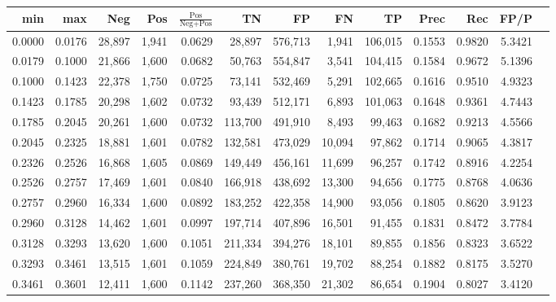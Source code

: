 \begin{tabular}{rrrrrrrrrrrrr}
\toprule
   min &    max &    Neg &   Pos & $\frac{\text{Pos}}{\text{Neg}+\text{Pos}}$ &      TN &      FP &      FN &      TP &   Prec &    Rec &   FP/P \\
\midrule
0.0000 & 0.0176 & 28,897 & 1,941 &                                     0.0629 &  28,897 & 576,713 &   1,941 & 106,015 & 0.1553 & 0.9820 & 5.3421 \\
0.0179 & 0.1000 & 21,866 & 1,600 &                                     0.0682 &  50,763 & 554,847 &   3,541 & 104,415 & 0.1584 & 0.9672 & 5.1396 \\
0.1000 & 0.1423 & 22,378 & 1,750 &                                     0.0725 &  73,141 & 532,469 &   5,291 & 102,665 & 0.1616 & 0.9510 & 4.9323 \\
0.1423 & 0.1785 & 20,298 & 1,602 &                                     0.0732 &  93,439 & 512,171 &   6,893 & 101,063 & 0.1648 & 0.9361 & 4.7443 \\
0.1785 & 0.2045 & 20,261 & 1,600 &                                     0.0732 & 113,700 & 491,910 &   8,493 &  99,463 & 0.1682 & 0.9213 & 4.5566 \\
0.2045 & 0.2325 & 18,881 & 1,601 &                                     0.0782 & 132,581 & 473,029 &  10,094 &  97,862 & 0.1714 & 0.9065 & 4.3817 \\
0.2326 & 0.2526 & 16,868 & 1,605 &                                     0.0869 & 149,449 & 456,161 &  11,699 &  96,257 & 0.1742 & 0.8916 & 4.2254 \\
0.2526 & 0.2757 & 17,469 & 1,601 &                                     0.0840 & 166,918 & 438,692 &  13,300 &  94,656 & 0.1775 & 0.8768 & 4.0636 \\
0.2757 & 0.2960 & 16,334 & 1,600 &                                     0.0892 & 183,252 & 422,358 &  14,900 &  93,056 & 0.1805 & 0.8620 & 3.9123 \\
0.2960 & 0.3128 & 14,462 & 1,601 &                                     0.0997 & 197,714 & 407,896 &  16,501 &  91,455 & 0.1831 & 0.8472 & 3.7784 \\
0.3128 & 0.3293 & 13,620 & 1,600 &                                     0.1051 & 211,334 & 394,276 &  18,101 &  89,855 & 0.1856 & 0.8323 & 3.6522 \\
0.3293 & 0.3461 & 13,515 & 1,601 &                                     0.1059 & 224,849 & 380,761 &  19,702 &  88,254 & 0.1882 & 0.8175 & 3.5270 \\
0.3461 & 0.3601 & 12,411 & 1,600 &                                     0.1142 & 237,260 & 368,350 &  21,302 &  86,654 & 0.1904 & 0.8027 & 3.4120 \\

\end{tabular}

